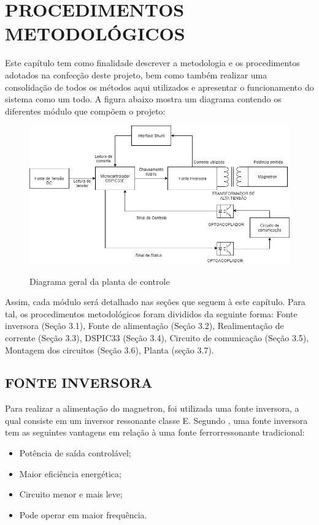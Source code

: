 \chapter{PROCEDIMENTOS METODOLÓGICOS}
\label{chap:metodologia}

Este capítulo tem como finalidade descrever a metodologia e os procedimentos adotados na confecção deste projeto, bem como também realizar uma consolidação de todos os métodos aqui utilizados e apresentar o funcionamento do sistema como um todo.  A figura abaixo mostra um diagrama contendo os diferentes módulo que compõem o projeto:

\begin{figure}[H]
    \centering
    \caption{Diagrama geral da planta de controle}
    \includegraphics[width=1\textwidth]{./dados/figuras/overall_diagram}
    \label{fig:figura-overall_diagram}
\end{figure}


Assim, cada módulo será detalhado nas seções que seguem à este capítulo. Para tal, os procedimentos metodológicos foram divididos da seguinte forma: Fonte inversora (Seção 3.1), Fonte de alimentação (Seção 3.2),  Realimentação de corrente (Seção 3.3), DSPIC33  (Seção 3.4), Circuito de comunicação (Seção 3.5), Montagem dos circuitos (Seção 3.6), Planta (seção 3.7).

\section{FONTE INVERSORA}
\label{sec:fonteInversora}

Para realizar a alimentação do magnetron, foi utilizada uma fonte inversora, a qual consiste em um inversor ressonante classe E. Segundo , uma fonte inversora tem as seguintes vantagens em relação à uma fonte ferrorressonante tradicional:
\begin{itemize}
    \item Potência de saída controlável;
    \item Maior eficiência energética;
    \item Circuito menor e mais leve;
    \item Pode operar em maior frequência.
\end{itemize} 

